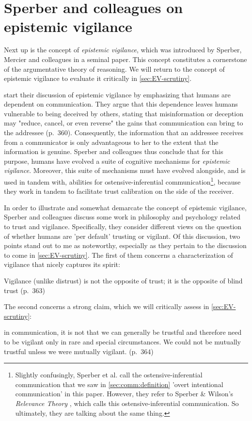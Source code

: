 \section{Sperber and colleagues on epistemic vigilance}
\label{sec:Sperber10}

Next up is the concept of \emph{epistemic vigilance}, which was introduced by Sperber, Mercier and colleagues in a seminal \citeyear{Sperber10} paper.
This concept constitutes a cornerstone of the argumentative theory of reasoning. We will return to the concept of epistemic vigilance to evaluate it critically in \cref{sec:EV-scrutiny}.

\citet{Sperber10} start their discussion of epistemic vigilance by emphasizing that humans are dependent on communication. They argue that this dependence leaves humans vulnerable to being deceived by others, stating that misinformation or deception may "reduce, cancel, or even reverse" the gains that communication can bring to the addressee (p.~360).
Consequently, the information that an addressee receives from a communicator is only advantageous to her to the extent that the information is genuine.
Sperber and colleagues thus conclude that for this purpose, humans have evolved a suite of cognitive mechanisms for \emph{epistemic vigilance}.
Moreover, this suite of mechanisms must have evolved alongside, and is used in tandem with, abilities for ostensive-inferential communication\footnote{Slightly confusingly, Sperber et al. call the ostensive-inferential communication that we saw in \cref{sec:comm:definition} 'overt intentional communication' in this paper. However, they refer to Sperber \& Wilson's \emph{Relevance Theory} \citeyear{SperberWilson86}, which calls this ostensive-inferential communication. So ultimately, they are talking about the same thing.}, because they work in tandem to facilitate trust calibration on the side of the receiver.

In order to illustrate and somewhat demarcate the concept of epistemic vigilance, Sperber and colleagues discuss some work in philosophy and psychology related to trust and vigilance. Specifically, they consider different views on the question of whether humans are 'per default' trusting or vigilant.
Of this discussion, two points stand out to me as noteworthy, especially as they pertain to the discussion to come in \cref{sec:EV-scrutiny}. The first of them concerns a characterization of vigilance that nicely captures its spirit:
\begin{quoting}
    Vigilance (unlike distrust) is not the opposite of trust; it is the opposite
of blind trust
    \hfill (p.~363)
\end{quoting}
The second concerns a strong claim, which we will critically assess in \cref{sec:EV-scrutiny}:
\begin{quoting}
    in communication, it is not that we can generally be trustful and therefore need to be vigilant only in rare and special circumstances. We could not be mutually trustful unless we were mutually vigilant.
    \hfill (p.~364)
\end{quoting}

